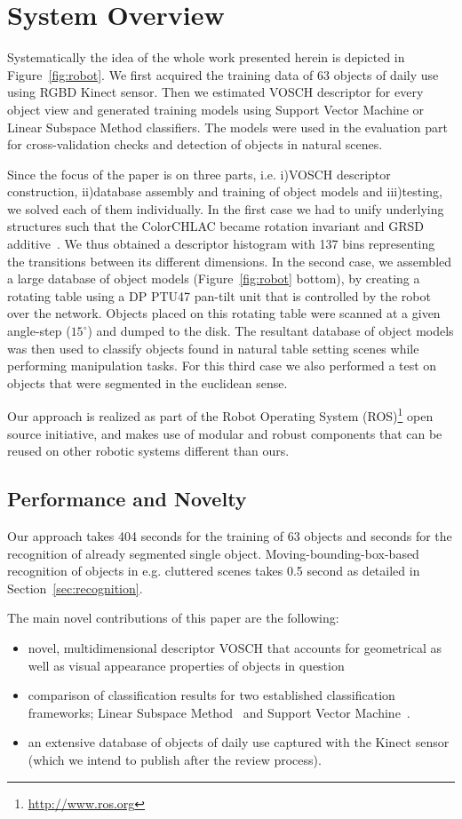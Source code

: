 \documentclass[conference]{sty/IEEEtran}
\begin{document}
\section{System Overview}
\label{sec:overview}
Systematically the idea of the whole work presented herein is depicted in 
Figure~\ref{fig:robot}. We first acquired the training data of 63 objects
of daily use using RGBD Kinect sensor. Then we estimated VOSCH descriptor 
for every object view and generated training models using Support Vector
Machine or Linear Subspace Method classifiers. The models were used
in the evaluation part for cross-validation checks and detection of 
objects in natural scenes.

Since the focus of the paper is on three parts, i.e. i)VOSCH descriptor
construction, ii)database assembly and training of object models and iii)testing,
we solved each of them individually. In the first case we had to unify underlying
structures such that the ColorCHLAC became rotation invariant and GRSD 
additive~\cite{kanezaki2010tvc}. We thus obtained a descriptor histogram with 
137 bins representing the transitions between its different dimensions.
In the second case, we assembled a large database of
object models (Figure~\ref{fig:robot} bottom), by creating a rotating
table using a DP PTU47 pan-tilt unit that is controlled by the robot over the
network. Objects placed on this rotating table were scanned at a given
angle-step ($15^\circ$) and dumped to the disk. The resultant database of
object models was then used to classify objects found in
natural table setting scenes while performing manipulation
tasks. For this third case we also performed a test on objects that were
segmented in the euclidean sense. 

Our approach is realized as part of the Robot Operating System
(ROS)\footnote{\url{http://www.ros.org}} open source initiative, and makes
use of modular and robust components that can be reused on other robotic
systems different than ours.

\subsection{Performance and Novelty}
Our approach takes 404 seconds for the training of 63 objects and  seconds
for the recognition of already segmented single object. Moving-bounding-box-based
recognition of objects in e.g. cluttered scenes takes 0.5 second as detailed
in Section~\ref{sec:recognition}.

The main novel contributions of this paper are the following:
\begin{itemize}
\item novel, multidimensional descriptor VOSCH that accounts for
geometrical as well as visual appearance  properties of objects in question
\item comparison of classification results for two established classification
frameworks; Linear Subspace Method~\cite{watanabe1973} and Support Vector Machine~\cite{svm99}.
\item an extensive database of objects of daily use captured with the Kinect sensor 
(which we intend to publish after the review process).
\end{itemize}
\end{document}
